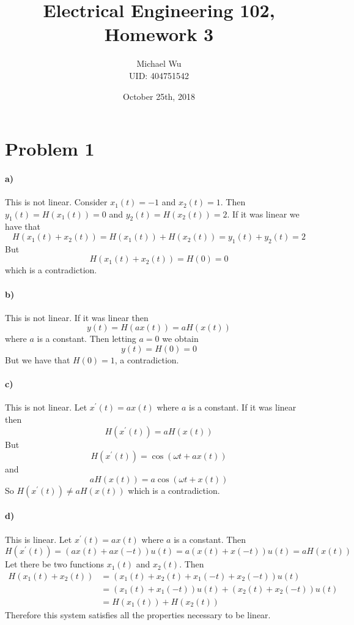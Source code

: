 \documentclass[12pt]{article}
\begin{document}
\title{Electrical Engineering 102, Homework 3}
\date{October 25th, 2018}
\author{Michael Wu\\UID: 404751542}
\maketitle

\section*{Problem 1}

\paragraph{a)}

This is not linear. Consider \(x_1(t)=-1\) and \(x_2(t)=1\). Then \(y_1(t)=H(x_1(t))=0\) and \(y_2(t)=H(x_2(t))=2\). If it was linear we have that
\[H(x_1(t)+x_2(t))=H(x_1(t))+H(x_2(t))=y_1(t)+y_2(t)=2\]
But
\[H(x_1(t)+x_2(t))=H(0)=0\]
which is a contradiction.

\paragraph{b)}

This is not linear. If it was linear then
\[y(t)=H(ax(t))=aH(x(t))\]
where \(a\) is a constant. Then letting \(a=0\) we obtain
\[y(t)=H(0)=0\]
But we have that \(H(0)=1\), a contradiction.

\paragraph{c)}

This is not linear. Let \(x^\prime(t)=ax(t)\) where \(a\) is a constant. If it was linear then
\[H(x^\prime(t))=aH(x(t))\]
But
\[H(x^\prime(t)) = \cos(\omega t + ax(t))\]
and
\[aH(x(t))=a\cos(\omega t + x(t))\]
So \(H(x^\prime(t))\neq aH(x(t))\) which is a contradiction.

\paragraph{d)}

This is linear. Let \(x^\prime(t)=ax(t)\) where \(a\) is a constant. Then
\[H(x^\prime(t))=(ax(t)+ax(-t))u(t)=a(x(t)+x(-t))u(t)=aH(x(t))\]
Let there be two functions \(x_1(t)\) and \(x_2(t)\).
Then
\begin{align*}
    H(x_1(t)+x_2(t))&=(x_1(t)+x_2(t)+x_1(-t)+x_2(-t))u(t)\\
    &=(x_1(t)+x_1(-t))u(t)+(x_2(t)+x_2(-t))u(t)\\
    &=H(x_1(t))+H(x_2(t))
\end{align*}
Therefore this system satisfies all the properties necessary to be linear.
\end{document}
